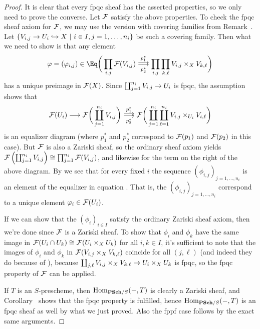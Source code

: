 \documentclass[a4paper,parskip=half,numbers=enddot, DIV=12]{scrreprt}
\begin{document}
\begin{proof}
	It is clear that every fpqc sheaf has the asserted properties, so we only need to prove the converse. Let $\mathcal{F}$ satisfy the above properties. To check the fpqc sheaf axiom for $\mathcal{F}$, we may use the version with covering families from Remark~. Let $\left\{V_{i,j}\morphism U_i\monomorphism X\st i\in I, j=1,\ldots, n_i\right\}$ be such a covering family. Then what we need to show is that any element
	\begin{align}\lbl{eq:phiEq1}
		\phi=(\phi_{i,j})\in\Eq\bigg(\prod_{i,j}\Ff(V_{i,j})\doublemorphism[ p_1^*][ p_2^*]\prod_{i,j}\prod_{k,\ell}V_{i,j}\times_XV_{k,\ell}\bigg)
	\end{align}
	has a unique preimage in $\mathcal{F}(X)$. Since $\coprod_{j=1}^{n_i}V_{i,j}\morphism U_i$ is fpqc, the assumption shows that 
	\begin{align}\lbl{eq:phiEq2}
		\Ff(U_i)\morphism\Ff\bigg(\coprod_{j=1}^{n_i}V_{i,j}\bigg)\doublemorphism[ p_1^*][ p_2^*]\Ff\bigg(\coprod_{j=1}^{n_i}\coprod_{\ell=1}^{n_i}V_{i,j}\times_{U_i}V_{i,\ell}\bigg)
	\end{align}
	is an equalizer diagram (where $ p_1^*$ and $ p_2^*$ correspond to $\mathcal{F}( p_1)$ and $\mathcal{F}( p_2)$ in this case). But $\mathcal{F}$ is also a Zariski sheaf, so the ordinary sheaf axiom yields $\mathcal{F}\left(\coprod_{j=1}^{n_i}V_{i,j}\right)\cong\prod_{j=1}^{n_i}\mathcal{F}(V_{i,j})$, and likewise for the term on the right of the above diagram. By  we see that for every fixed $i$ the sequence $(\phi_{i,j})_{j=1,\ldots,n_i}$ is an element of the equalizer in equation . That is, the $(\phi_{i,j})_{j=1,\ldots,n_i}$ correspond to a unique element $\varphi_i\in \mathcal{F}(U_i)$.
	
	If we can show that the $(\phi_i)_{i\in I}$ satisfy the ordinary Zariski sheaf axiom, then we're done since $\mathcal{F}$ is a Zariski sheaf. To show that $\phi_i$ and $\phi_k$ have the same image in $\mathcal{F}(U_i\cap U_k)\cong \mathcal{F}(U_i\times_XU_k)$ for all $i,k\in I$, it's sufficient to note that the images of $\phi_i$ and $\phi_k$ in $\mathcal{F}(V_{i,j}\times_XV_{k,\ell})$ coincide for all $(j,\ell)$ (and indeed they do because of ), because $\coprod_{j,\ell}V_{i,j}\times_XV_{k,\ell}\morphism U_i\times_XU_k$ is fpqc, so the fpqc property of $\mathcal{F}$ can be applied.
	
	If $T$ is an $S$-prescheme, then $\Hom_{\cat{PSch}/S}(-,T)$ is clearly a Zariski sheaf, and Corollary~ shows that the fpqc property is fulfilled, hence $\Hom_{\cat{PSch}/S}(-,T)$ is an fpqc sheaf as well by what we just proved. Also the fppf case follows by the exact same arguments.
\end{proof}
\end{document}
